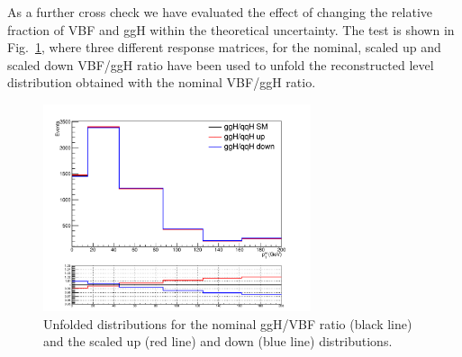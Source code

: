 As a further cross check we have evaluated the effect of changing the relative fraction of VBF and ggH within the theoretical uncertainty. The test is shown in Fig.~\ref{fig:vbfOverGghRatioVaried}, where three different response matrices, for the nominal, scaled up and scaled down VBF/ggH ratio have been used to unfold the reconstructed level distribution obtained with the nominal VBF/ggH ratio.
\begin{figure}[htb]
\centering
\includegraphics[width=0.7\textwidth]{images/gghvbfratio.pdf}
\caption{Unfolded distributions for the nominal ggH/VBF ratio (black line) and the scaled up (red line) and down (blue line) distributions.}
\label{fig:vbfOverGghRatioVaried}
\end{figure}



